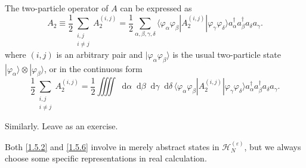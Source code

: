 \documentclass[b5paper,10pt,UTF8]{book}
\newcommand*\dd{\mathop{}\!\mathrm{d}}
\numberwithin{equation}{section}
\begin{document}
		\begin{Proposition}
			The two-particle operator of $A$ can be expressed as
			\begin{equation}\label{1.5.6}
				A_2\equiv\dfrac{1}{2}\sum_{\substack{i,j\\i\neq j}}A_2^{(i,j)}=\dfrac{1}{2}\sum_{\alpha,\beta,\gamma,\delta}\langle\varphi_\alpha\varphi_\beta|A_2^{(i,j)}|\varphi_\gamma\varphi_\delta\rangle a_\alpha^\dagger a_\beta^\dagger a_\delta a_\gamma.
			\end{equation}
			where $(i,j)$ is an arbitrary pair and $|\varphi_\alpha\varphi_\beta\rangle$ is the usual two-particle state $|\varphi_\alpha\rangle\otimes|\varphi_\beta\rangle$,
			or in the continuous form
			$$\dfrac{1}{2}\sum_{\substack{i,j\\i\neq j}}A_2^{(i,j)}=\dfrac{1}{2}\iiiint\dd\alpha\dd\beta\dd\gamma\dd\delta\,\langle\varphi_\alpha\varphi_\beta|A_2^{(i,j)}|\varphi_\gamma\varphi_\delta\rangle a_\alpha^\dagger a_\beta^\dagger a_\delta a_\gamma.$$
		\end{Proposition}
		\begin{Proof}
			Similarly. Leave as an exercise.
		\end{Proof}
		Both \eqref{1.5.2} and \eqref{1.5.6} involve in merely abstract states in $\mathcal{H}_N^{(\varepsilon)}$, but we always choose some specific representations in real calculation.

\end{document}
